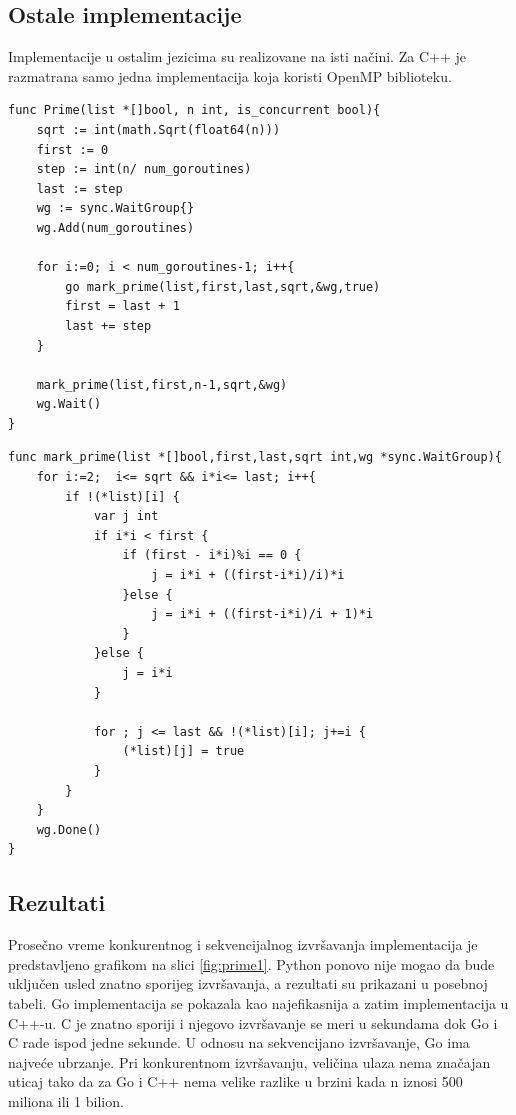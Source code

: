 \documentclass[12pt,oneside]{memoir}
\begin{document}
\subsection{Ostale implementacije}
Implementacije u ostalim jezicima su realizovane na isti načini. Za C++ je razmatrana samo jedna implementacija koja koristi OpenMP biblioteku.

\begin{center}
\begin{lstlisting}[caption=Go implementacija konkurentne funkcije za određivanje prostih brojeva manjih od n,label={lst:prime1},backgroundcolor=\color{background}]
func Prime(list *[]bool, n int, is_concurrent bool){
	sqrt := int(math.Sqrt(float64(n)))
	first := 0
	step := int(n/ num_goroutines)
	last := step
	wg := sync.WaitGroup{}
	wg.Add(num_goroutines)

	for i:=0; i < num_goroutines-1; i++{
		go mark_prime(list,first,last,sqrt,&wg,true)
		first = last + 1
		last += step
	}

	mark_prime(list,first,n-1,sqrt,&wg)
	wg.Wait()
}
\end{lstlisting}
\end{center}

\begin{center}
\begin{lstlisting}[caption=Go implementacija konkurentne funkcije za označavanje prostih brojeva,label={lst:prime2},float, backgroundcolor=\color{background},belowskip=-1.2 \baselineskip]
func mark_prime(list *[]bool,first,last,sqrt int,wg *sync.WaitGroup){
	for i:=2;  i<= sqrt && i*i<= last; i++{
		if !(*list)[i] {
			var j int
			if i*i < first {
				if (first - i*i)%i == 0 {
					j = i*i + ((first-i*i)/i)*i
				}else {
					j = i*i + ((first-i*i)/i + 1)*i
				}
			}else {
				j = i*i
			}
		
			for ; j <= last && !(*list)[i]; j+=i {
				(*list)[j] = true
			}
		}
	}
	wg.Done()
}
\end{lstlisting}
\end{center}

\subsection{Rezultati}

Prosečno vreme konkurentnog i sekvencijalnog izvršavanja implementacija je predstavljeno grafikom na slici \ref{fig:prime1}. Python ponovo nije mogao da bude uključen usled znatno sporijeg izvršavanja, a rezultati su prikazani u posebnoj tabeli. Go implementacija se pokazala kao najefikasnija a zatim implementacija u C++-u. C je znatno sporiji i njegovo izvršavanje se meri u sekundama dok Go i C rade ispod jedne sekunde. U odnosu na sekvencijano izvršavanje, Go ima najveće ubrzanje. Pri konkurentnom izvršavanju, veličina ulaza nema značajan uticaj tako da za Go i C++ nema velike razlike u brzini kada n iznosi 500 miliona ili 1 bilion. 
\\
\end{document}
